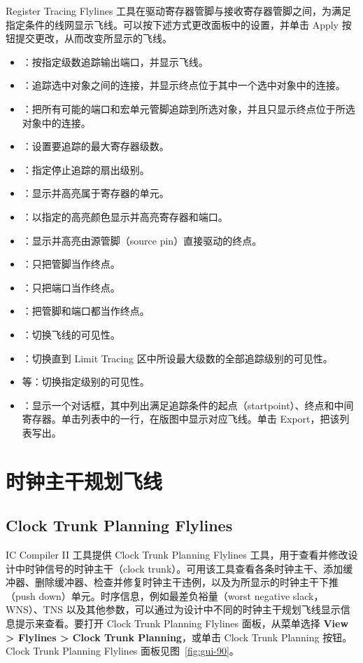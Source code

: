 Register Tracing Flylines 工具在驱动寄存器管脚与接收寄存器管脚之间，为满足指定条件的线网显示飞线。可以按下述方式更改面板中的设置，并单击 Apply 按钮提交更改，从而改变所显示的飞线。
\begin{itemize}
  \item {}：按指定级数追踪输出端口，并显示飞线。
  \item {}：追踪选中对象之间的连接，并显示终点位于其中一个选中对象中的连接。
  \item {}：把所有可能的端口和宏单元管脚追踪到所选对象，并且只显示终点位于所选对象中的连接。
  \item {}：设置要追踪的最大寄存器级数。
  \item {}：指定停止追踪的扇出级别。
  \item {}：显示并高亮属于寄存器的单元。
  \item {}：以指定的高亮颜色显示并高亮寄存器和端口。
  \item {}：显示并高亮由源管脚（source pin）直接驱动的终点。
  \item {}：只把管脚当作终点。
  \item {}：只把端口当作终点。
  \item {}：把管脚和端口都当作终点。
  \item {}：切换飞线的可见性。
  \item {}：切换直到 Limit Tracing 区中所设最大级数的全部追踪级别的可见性。
  \item {} 等：切换指定级别的可见性。
  \item {}：显示一个对话框，其中列出满足追踪条件的起点（startpoint）、终点和中间寄存器。单击列表中的一行，在版图中显示对应飞线。单击 Export，把该列表写出。
\end{itemize}

\section{时钟主干规划飞线}
\subsection*{Clock Trunk Planning Flylines}

IC Compiler II 工具提供 Clock Trunk Planning Flylines 工具，用于查看并修改设计中时钟信号的时钟主干（clock trunk）。可用该工具查看各条时钟主干、添加缓冲器、删除缓冲器、检查并修复时钟主干违例，以及为所显示的时钟主干下推（push down）单元。时序信息，例如最差负裕量（worst negative slack，WNS）、TNS 以及其他参数，可以通过为设计中不同的时钟主干规划飞线显示信息提示来查看。要打开 Clock Trunk Planning Flylines 面板，从菜单选择 \textbf{View > Flylines > Clock Trunk Planning}，或单击 Clock Trunk Planning 按钮。Clock Trunk Planning Flylines 面板见图~\ref{fig:gui-90}。

